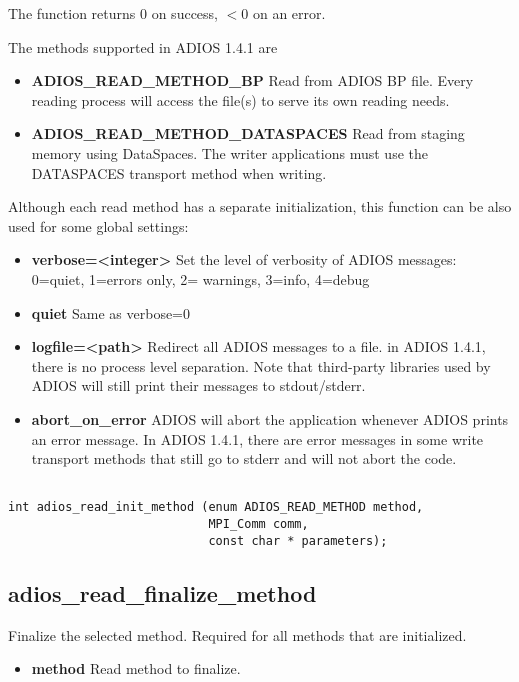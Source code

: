 \noindent The function returns 0 on success, $<0$ on an error.

The methods supported in ADIOS 1.4.1 are

\begin{itemize}
\item{\bf ADIOS\_READ\_METHOD\_BP}   Read from ADIOS BP file. 
Every reading process will access the file(s) to serve its own reading needs.

\item{\bf ADIOS\_READ\_METHOD\_DATASPACES} Read from staging memory using DataSpaces. The writer applications must use the DATASPACES transport method when writing.  

\end{itemize}

Although each read method has a separate initialization, this function can be also used for some global 
settings:

\begin{itemize}
\item{\bf verbose=<integer>} Set the level of verbosity of ADIOS messages: 0=quiet, 1=errors only, 2= warnings, 3=info, 4=debug
\item{\bf quiet} Same as verbose=0
\item{\bf logfile=<path>} Redirect all ADIOS messages to a file. in ADIOS 1.4.1, there is no process level separation. Note that third-party libraries used by ADIOS will still print their messages to stdout/stderr.
\item{\bf abort\_on\_error} ADIOS will abort the application whenever ADIOS prints an error message. In ADIOS 1.4.1, there are error messages in some write transport methods that still go to stderr and will not abort the code. 
\end{itemize}

\begin{lstlisting}[alsolanguage=C]

int adios_read_init_method (enum ADIOS_READ_METHOD method, 
                            MPI_Comm comm, 
                            const char * parameters);

\end{lstlisting}


\subsection{adios\_read\_finalize\_method}

Finalize the selected method. Required for all methods that are initialized. 
\begin{itemize}
\item{\bf method} Read method to finalize. 
\end{itemize}

